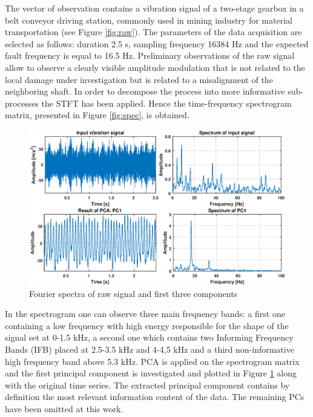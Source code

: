 \documentclass[10pt]{article}
\begin{document}
The vector of observation contains a vibration signal of a two-stage gearbox in a belt conveyor driving station, commonly used in mining industry for material transportation (see Figure \ref{fig:raw}). The parameters of the data acquisition are selected as follows: duration 2.5 s, sampling frequency 16384 Hz and the expected fault frequency is equal to 16.5 Hz. Preliminary observations of the raw signal allow to observe a clearly visible amplitude modulation that is not related to the local damage under investigation but is related to a misalignment of the neighboring shaft. In order to decompose the process into more informative sub-processes the STFT has been applied. Hence the time-frequency spectrogram matrix, presented in Figure \ref{fig:spec}, is obtained.
\begin{figure}[ht!]
\centering
\includegraphics[width=\textwidth]{wykresy/widma.eps}
\caption{Fourier spectra of raw signal and first three components}
\label{fig:widmo}
\end{figure}
In the spectrogram one can observe three main frequency bands: a first one containing a low frequency with high energy responsible for the shape of the signal set at 0-1.5 kHz, a second one which contains two Informing Frequency Bands (IFB) placed at 2.5-3.5 kHz and 4-4,5 kHz and a third non-informative high frequency band above 5.3 kHz. PCA is applied on the spectrogram matrix and the first principal component is investigated and plotted in Figure \ref{fig:widmo} along with the original time series. The extracted principal component contains by definition the most relevant information content of the data. The remaining PCs have been omitted at this work.
\end{document}
